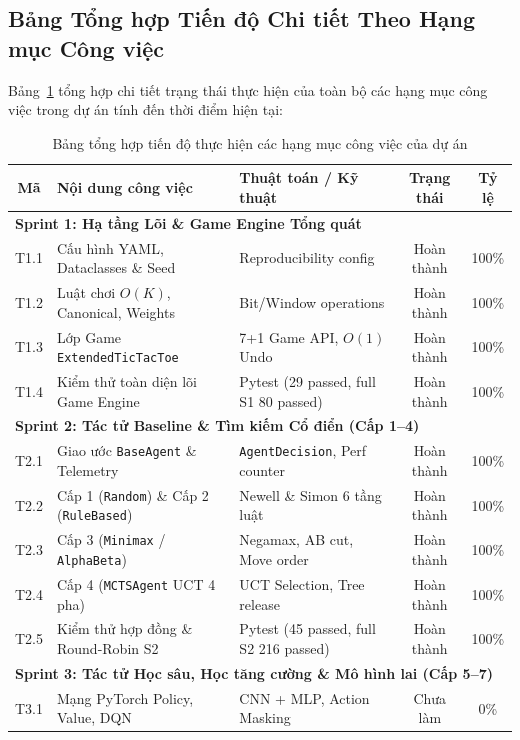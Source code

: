 \documentclass[a4paper,12pt]{report}
\begin{document}
\subsection{Bảng Tổng hợp Tiến độ Chi tiết Theo Hạng mục Công việc}
Bảng~\ref{tab:progress_tasks} tổng hợp chi tiết trạng thái thực hiện của toàn bộ các hạng mục công việc trong dự án tính đến thời điểm hiện tại:

\begin{table}[H]
\centering
\small
\caption{Bảng tổng hợp tiến độ thực hiện các hạng mục công việc của dự án}
\label{tab:progress_tasks}
\vspace{0.2cm}
\begin{tabular}{cp{6.0cm}p{4.6cm}cc}
\toprule
\textbf{Mã} & \textbf{Nội dung công việc} & \textbf{Thuật toán / Kỹ thuật} & \textbf{Trạng thái} & \textbf{Tỷ lệ} \\
\midrule
\multicolumn{5}{l}{\textbf{Sprint 1: Hạ tầng Lõi \& Game Engine Tổng quát}} \\
T1.1 & Cấu hình YAML, Dataclasses \& Seed & Reproducibility config & Hoàn thành & 100\% \\
T1.2 & Luật chơi $O(K)$, Canonical, Weights & Bit/Window operations & Hoàn thành & 100\% \\
T1.3 & Lớp Game \texttt{ExtendedTicTacToe} & 7+1 Game API, $O(1)$ Undo & Hoàn thành & 100\% \\
T1.4 & Kiểm thử toàn diện lõi Game Engine & Pytest (29 passed, full S1 80 passed) & Hoàn thành & 100\% \\
\midrule
\multicolumn{5}{l}{\textbf{Sprint 2: Tác tử Baseline \& Tìm kiếm Cổ điển (Cấp 1--4)}} \\
T2.1 & Giao ước \texttt{BaseAgent} \& Telemetry & \texttt{AgentDecision}, Perf counter & Hoàn thành & 100\% \\
T2.2 & Cấp 1 (\texttt{Random}) \& Cấp 2 (\texttt{RuleBased}) & Newell \& Simon 6 tầng luật & Hoàn thành & 100\% \\
T2.3 & Cấp 3 (\texttt{Minimax} / \texttt{AlphaBeta}) & Negamax, AB cut, Move order & Hoàn thành & 100\% \\
T2.4 & Cấp 4 (\texttt{MCTSAgent} UCT 4 pha) & UCT Selection, Tree release & Hoàn thành & 100\% \\
T2.5 & Kiểm thử hợp đồng \& Round-Robin S2 & Pytest (45 passed, full S2 216 passed) & Hoàn thành & 100\% \\
\midrule
\multicolumn{5}{l}{\textbf{Sprint 3: Tác tử Học sâu, Học tăng cường \& Mô hình lai (Cấp 5--7)}} \\
T3.1 & Mạng PyTorch Policy, Value, DQN & CNN + MLP, Action Masking & Chưa làm & 0\% \\

\end{tabular}
\end{table}
\end{document}
